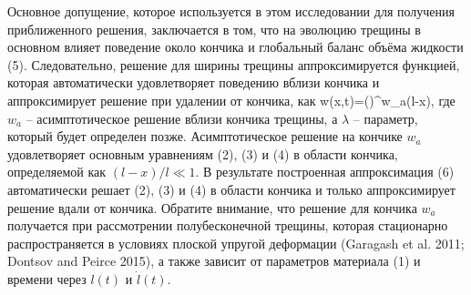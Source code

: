 \documentclass[main.tex]{subfiles}
\begin{document}
Основное допущение, которое используется в этом исследовании для получения приближенного решения, заключается в том, что на эволюцию трещины в основном влияет поведение около кончика и глобальный баланс объёма жидкости (5).
Следовательно, решение для ширины трещины аппроксимируется функцией, которая автоматически удовлетворяет поведению вблизи кончика и аппроксимирует решение при удалении от кончика, как
\beq
w(x,t)=\left(\right)^{\lambda}w_a(l-x),
\eeq
где $w_a$ -- асимптотическое решение вблизи кончика трещины, а $\lambda$ -- параметр, который будет определен позже.
Асимптотическое решение на кончике $w_a$ удовлетворяет основным уравнениям (2), (3) и (4) в области кончика, определяемой как $(l-x)/l\ll 1$.
В результате построенная аппроксимация (6) автоматически решает (2), (3) и (4) в области кончика и только аппроксимирует решение вдали от кончика.
Обратите внимание, что решение для кончика $w_a$ получается при рассмотрении полубесконечной трещины, которая стационарно распространяется в условиях плоской упругой деформации (Garagash et al. 2011; Dontsov and Peirce 2015), а также зависит от параметров материала (1) и времени через $l(t)$ и $\dot{l}(t)$.
\end{document}
